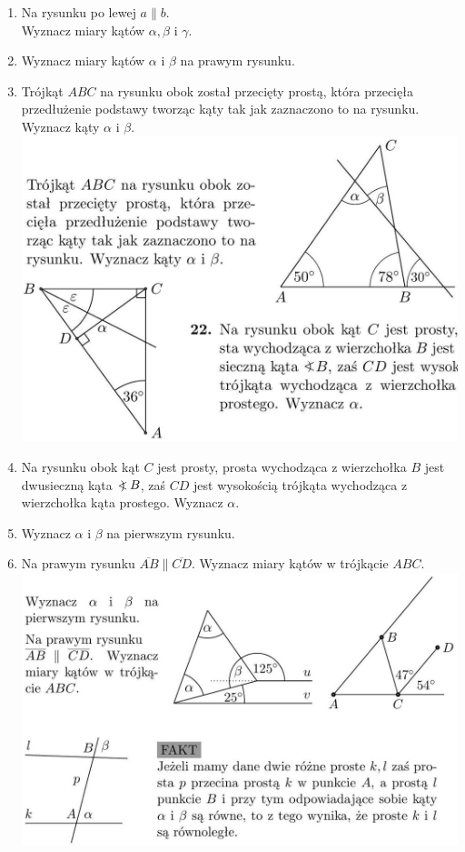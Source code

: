 \documentclass[10pt]{article}
\newcommand\Varangle{\mathop{{<\!\!\!\!\!\text{\small)}}\:}\nolimits}
\begin{document}
\begin{enumerate}
  \item Na rysunku po lewej \(a \| b\).\\
Wyznacz miary kątów \(\alpha, \beta\) i \(\gamma\).
  \item Wyznacz miary kątów \(\alpha\) i \(\beta\) na prawym rysunku.
  \item Trójkąt \(A B C\) na rysunku obok został przecięty prostą, która przecięła przedłużenie podstawy tworząc kąty tak jak zaznaczono to na rysunku. Wyznacz kąty \(\alpha\) i \(\beta\).\\
\includegraphics[max width=\textwidth, center]{2024_11_21_8f01584889ff06348ae7g-192(1)}
  \item Na rysunku obok kąt \(C\) jest prosty, prosta wychodząca z wierzchołka \(B\) jest dwusieczną kąta \(\Varangle B\), zaś \(C D\) jest wysokością trójkąta wychodząca z wierzchołka kąta prostego. Wyznacz \(\alpha\).
  \item Wyznacz \(\alpha\) i \(\beta\) na pierwszym rysunku.
  \item Na prawym rysunku \(\overline{A B} \| \overline{C D}\). Wyznacz miary kątów w trójkącie \(A B C\).\\
\includegraphics[max width=\textwidth, center]{2024_11_21_8f01584889ff06348ae7g-193}
\end{enumerate}
\end{document}
